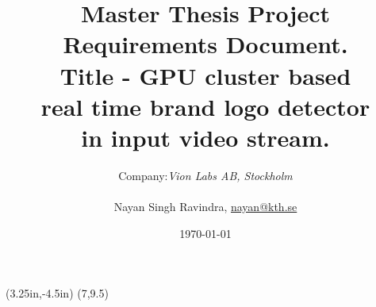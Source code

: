 \documentclass[12pt]{article}
\title{Master Thesis Project Requirements Document. \\ 
	Title - GPU cluster based \\ real time brand logo detector \\ in input video stream.}
\author{ Company:{\it  Vion Labs AB, Stockholm} 
	\\\\Nayan Singh Ravindra, \hyperlink{mailto:nayan@kth.se}{nayan@kth.se}}
\date{\today}
\begin{document}
	
	\thisfancyput(3.25in,-4.5in){%
		\setlength{\unitlength}{1in}\fancyoval(7,9.5)}%
	
	\maketitle
	\pagebreak
	
	\printbibliography	
	
\end{document}
